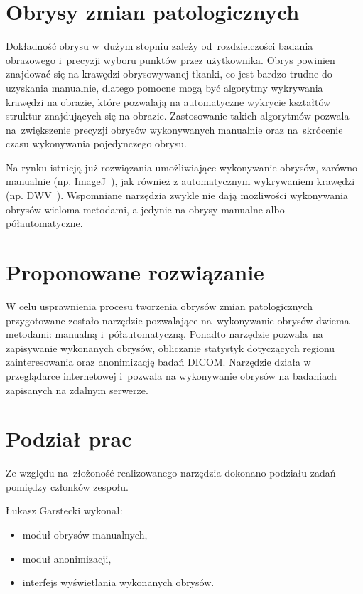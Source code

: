 \documentclass[a4paper,11pt,twoside,openright]{report}
\theoremstyle{definition}
\begin{document}
\section {Obrysy zmian patologicznych}

Dokładność obrysu w~dużym stopniu zależy od~rozdzielczości badania obrazowego i~precyzji
wyboru punktów przez użytkownika. Obrys powinien znajdować się na krawędzi
obrysowywanej tkanki, co jest bardzo trudne do uzyskania manualnie,
dlatego pomocne mogą być algorytmy wykrywania krawędzi na obrazie, które pozwalają na automatyczne
wykrycie kształtów struktur znajdujących się na obrazie. Zastosowanie takich algorytmów
pozwala na~zwiększenie precyzji obrysów wykonywanych manualnie oraz na~skrócenie
czasu wykonywania pojedynczego obrysu.

Na rynku istnieją już rozwiązania umożliwiające wykonywanie obrysów,
zarówno manualnie (np. ImageJ~\cite{ImageJ}), jak również z automatycznym wykrywaniem krawędzi (np. DWV~\cite{DWV}).
Wspomniane narzędzia zwykle nie dają możliwości wykonywania obrysów wieloma metodami,
a jedynie na obrysy manualne albo półautomatyczne.

\section {Proponowane rozwiązanie}

W celu usprawnienia procesu tworzenia obrysów zmian patologicznych przygotowane
zostało narzędzie pozwalające na~wykonywanie obrysów dwiema metodami:
manualną i~półautomatyczną. Ponadto narzędzie pozwala~na zapisywanie wykonanych obrysów,
obliczanie statystyk dotyczących regionu zainteresowania oraz anonimizację badań DICOM.
Narzędzie działa w przeglądarce internetowej i~pozwala na wykonywanie obrysów na badaniach
zapisanych na zdalnym serwerze.

\section {Podział prac}

Ze względu na~złożoność realizowanego narzędzia dokonano podziału zadań pomiędzy
członków zespołu.

\pagebreak

Łukasz Garstecki wykonał:

\begin{itemize}[noitemsep]
	\item moduł obrysów manualnych,
	\item moduł anonimizacji,
	\item interfejs wyświetlania wykonanych obrysów.
\end{itemize}
\end{document}
